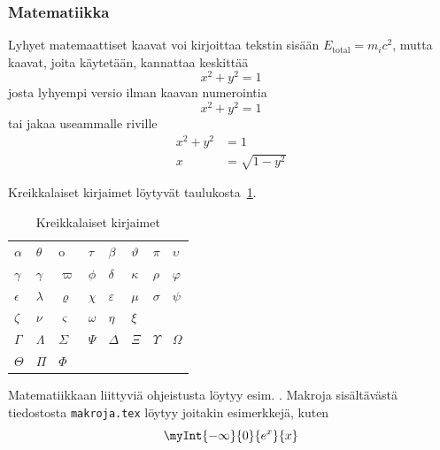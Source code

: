\subsubsection{Matematiikka}
\label{sec:esimmatematiikka}

Lyhyet matemaattiset kaavat voi kirjoittaa tekstin
sisään $E_{\textrm{total}} = m_i c^2$, mutta kaavat, joita käytetään, 
kannattaa keskittää
%
\begin{equation}
\label{eq:kaava1}
x^2 + y^2 = 1 
\end{equation}
%
josta lyhyempi versio ilman kaavan numerointia
%
\[ x^2 + y^2 = 1 \]
%
tai jakaa useammalle riville
\begin{equation}
\label{eq:kaava2}
\begin{aligned}
x^2 + y^2 &= 1 \\
        x &= \sqrt{1-y^2}
\end{aligned}
\end{equation}
%

Kreikkalaiset kirjaimet löytyvät taulukosta~\ref{table:kreikka}.

\begin{table}
\caption{Kreikkalaiset kirjaimet}
\label{table:kreikka}
\begin{center}
\begin{tabular}{|llllllll|}
\hline
$\alpha$        &$\theta$       &o              &$\tau$         &%
$\beta$         &$\vartheta$    &$\pi$          &$\upsilon$     \\
$\gamma$        &$\gamma$       &$\varpi$       &$\phi$         &%
$\delta$        &$\kappa$       &$\rho$         &$\varphi$      \\
$\epsilon$      &$\lambda$      &$\varrho$      &$\chi$         &%
$\varepsilon$   &$\mu$          &$\sigma$       &$\psi$         \\
$\zeta$         &$\nu$          &$\varsigma$    &$\omega$       &%
$\eta$          &$\xi$          &               &               \\
\hline
$\Gamma$        &$\Lambda$      &$\Sigma$       &$\Psi$         &%
$\Delta$        &$\Xi$          &$\Upsilon$     &$\Omega$       \\
$\Theta$        &$\Pi$          &$\Phi$         & & & & &       \\
\hline
\end{tabular}
\end{center}
\end{table}

Matematiikkaan liittyviä ohjeistusta löytyy esim. \citet{lyhyt2e}.
Makroja sisältävästä tiedostosta \verb!makroja.tex! löytyy joitakin
esimerkkejä, kuten 
%
\[ \myInt{-\infty}{0}{e^{x}}{x} \]
%

